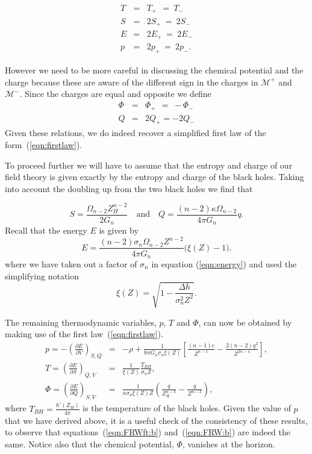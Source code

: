 \documentclass[a4paper,12pt]{article}
\begin{document}
\begin{eqnarray}
T &=& T_+ \ \ = \  T_- \nonumber \\ S &=& 2S_+ \ = \ 2S_- \nonumber \\
E &=& 2E_+ \ = \ 2E_-  \nonumber \\ p &=& 2p_+ \ = \ 2p_- \nonumber.
\end{eqnarray}

However we need to be more careful in discussing the chemical
potential and the charge because these are aware of the different sign
in the charges in  $\mathcal{M}^+$ and $\mathcal{M}^-$.  Since the
charges are equal and opposite we define
\begin{eqnarray}
\Phi &=& \Phi_+ \ \ = \ -\Phi_- \nonumber \\ Q &=& 2Q_+ = -2Q_-
\nonumber
\end{eqnarray}
Given these relations, we do indeed recover a simplified first law of
the form~(\ref{eqn:firstlaw}).

To proceed further we will have to assume that the entropy and charge
of our field theory is given exactly by the entropy and charge of the
black holes.  Taking into account the doubling up from the two black
holes we find that

\begin{equation} \label{eqn:S}
S=\frac{\Omega_{n-2}Z_H^{n-2}}{2G_n} \quad \textrm{and} \quad
Q=\frac{(n-2)\kappa \Omega_{n-2}}{4\pi G_n} q.
\end{equation}
Recall that the energy $E$ is given by
\begin{equation}
E = \frac{(n-2)\sigma_n\Omega_{n-2}Z^{n-2}}{4\pi G_n}\bigg(\xi(Z) -
1\bigg).
\end{equation}
where we have taken out a factor of $\sigma_n$ in equation
(\ref{eqn:energy}) and used the simplifying notation
\begin{equation}
\xi(Z) = \sqrt{1-\frac{\Delta h}{\sigma_n^2 Z^2}}.
\end{equation}

The remaining thermodynamic variables, $p$,  $T$ and  $\Phi$, can now
be obtained by making use of the first law~(\ref{eqn:firstlaw}).
\begin{eqnarray}
p = -\left(\frac{\partial E}{\partial V}\right)_{S,Q} & = &  -\rho
+\frac{1}{8\pi G_n\sigma_n \xi(Z)} \left[\frac{(n-1)c}{Z^{n-1}} -
\frac{2(n-2)q^2}{Z^{2n-4}}\right] ,\\ T = \left(\frac{\partial
E}{\partial S}\right)_{Q,V} & = &
\frac{1}{\xi(Z)}\frac{T_{BH}}{\sigma_n Z}, \\ \Phi =
\left(\frac{\partial E}{\partial Q}\right)_{S,V} & = & \frac{1}{\kappa
\sigma_n\xi(Z)Z} \left(\frac{q}{Z_H^{n-3}}-\frac{q}{Z^{n-3}}\right),
\end{eqnarray}
where $T_{BH}=\frac{h'(Z_H)}{4\pi}$ is the temperature of the black
holes.  Given the value of $p$ that we have derived above, it is a
useful check of the consistency of these results, to observe that
equations~(\ref{eqn:FRWft:b}) and~(\ref{eqn:FRW:b}) are indeed the
same. Notice also that the chemical potential, $\Phi$, vanishes at the
horizon.
\end{document}
